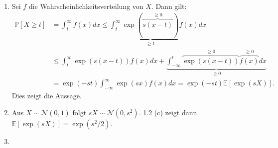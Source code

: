 \documentclass[a4paper]{article}
\begin{document}
\begin{enumerate}[label=(\alph*)]
	\item Sei $f$ die Wahrscheinlichkeitsverteilung von $X$. Dann gilt:
	      \begin{align*}
		      \mathds{P}[X \geq t] & = \int_{t}^{\infty} f(x) dx \leq \int_{t}^{\infty} \underbrace{\exp(\overbrace{s(x-t)}^{\geq 0})}_{\geq 1} f(x) dx                                    \\
		                           & \leq \int_{t}^{\infty} \exp(s(x-t)) f(x) dx + \underbrace{\int_{-\infty}^{t} \overbrace{\exp(s(x-t))}^{\geq 0} \overbrace{f(x)}^{\geq 0} dx}_{\geq 0} \\
		                           & = \exp(-st) \int_{-\infty}^{\infty} \exp(sx) f(x) dx = \exp(-st) \mathds{E}[\exp(sX)]\text{.}
	      \end{align*}
	      Dies zeigt die Aussage.
	\item Aus $X \sim \mathcal{N}(0,1)$ folgt $sX \sim \mathcal{N}(0,s^2)$. 1.2 (c) zeigt dann $\mathds{E}[\exp(sX)] = \exp(s^2/2)$.
	\item
\end{enumerate}

\subsection{}
\end{document}
